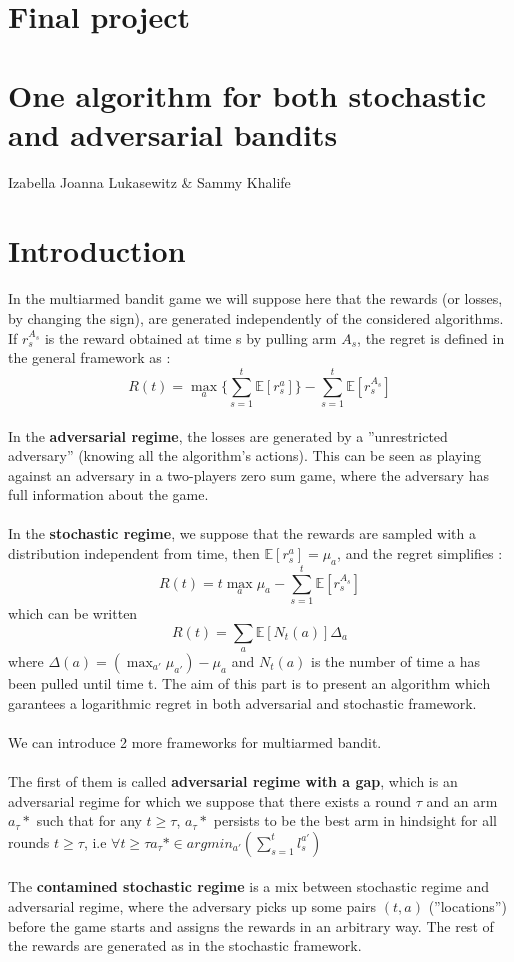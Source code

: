 \documentclass[12pt]{article}
\begin{document}
\begin{center}
\section*{Final project}
\section*{One algorithm for both stochastic and adversarial bandits}
\large{Izabella Joanna Lukasewitz \& Sammy Khalife}
\end{center}

\section*{Introduction}
In the multiarmed bandit game we will suppose here that the rewards (or losses, by changing the sign), are generated independently of the considered algorithms. If $r_{s}^{A_{s}}$ is the reward obtained at time s by pulling arm $A_{s}$, the regret is defined in the general framework as :
$$R(t)=\max_{a}\{ \sum_{s=1}^{t} \mathbb{E}[r_{s}^{a}]\}-\sum_{s=1}^{t} \mathbb{E}[r_{s}^{A_{s}}]$$~\\
In the \textbf{adversarial regime}, the losses are generated by a ''unrestricted adversary'' (knowing all the algorithm's actions). This can be seen as playing against an adversary in a two-players zero sum game, where the adversary has full information about the game.~\\
~\\
In the \textbf{stochastic regime}, we suppose that the rewards are sampled with a distribution independent from time, then $\mathbb{E}[r_{s}^{a}]=\mu_{a}$, and the regret simplifies : 
$$R(t)=t\max_{a}\mu_{a}-\sum_{s=1}^{t} \mathbb{E}[r_{s}^{A_{s}}]$$
which can be written $$R(t)=\sum_{a}\mathbb{E}[N_{t}(a)]\Delta_{a}$$ where $\Delta(a)=(\max_{a'}\mu_{a'})-\mu_{a}$ and $N_{t}(a)$ is the number of time a has been pulled until time t.
The aim of this part is to present an algorithm which garantees a logarithmic regret in both adversarial and stochastic framework.~\\
~\\
We can introduce 2 more frameworks for multiarmed bandit.~\\
~\\
The first of them is called \textbf{adversarial regime with a gap}, which is an adversarial regime for which we suppose that there exists a round $\tau$ and an arm $a_{\tau}*$ such that for any $t \geq \tau$, $a_{\tau}*$ persists to be the best arm in hindsight for all rounds $t \geq \tau$, i.e $\forall t \geq \tau a_{\tau}* \in argmin_{a'}(\sum_{s=1}^{t}l_{s}^{a'})$~\\
~\\
The \textbf{contamined stochastic regime} is a mix between stochastic regime and adversarial regime, where the adversary picks up some pairs $(t,a)$ (''locations'') before the game starts and assigns the rewards in an arbitrary way. The rest of the rewards are generated as in the stochastic framework.
\newpage
\end{document}
